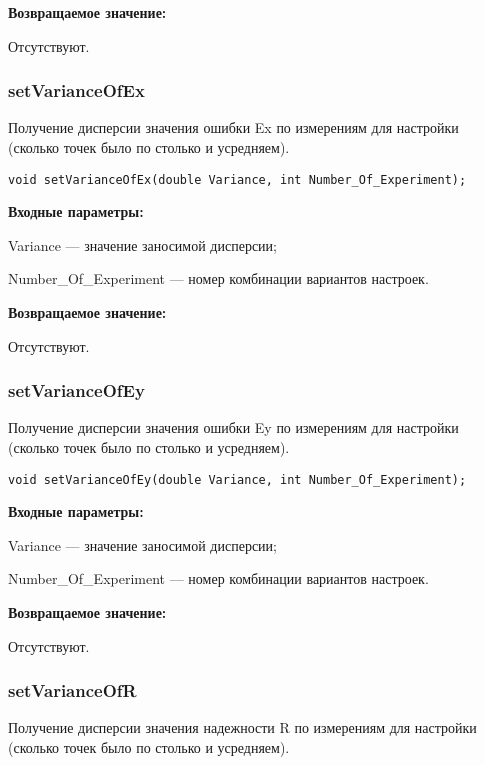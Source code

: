 \documentclass[a4paper,12pt]{article}
\begin{document}
\textbf{Возвращаемое значение:}

Отсутствуют.


\subsubsection{setVarianceOfEx}\label{setVarianceOfEx}

Получение дисперсии значения ошибки Ex по измерениям для настройки (сколько точек было по столько и усредняем).


\begin{lstlisting}[label=code_syntax_setVarianceOfEx,caption=Синтаксис]
void setVarianceOfEx(double Variance, int Number_Of_Experiment);
\end{lstlisting}

\textbf{Входные параметры:}

Variance --- значение заносимой дисперсии;

Number\_Of\_Experiment --- номер комбинации вариантов настроек.

\textbf{Возвращаемое значение:}

Отсутствуют.


\subsubsection{setVarianceOfEy}\label{setVarianceOfEy}

Получение дисперсии значения ошибки Ey по измерениям для настройки (сколько точек было по столько и усредняем).


\begin{lstlisting}[label=code_syntax_setVarianceOfEy,caption=Синтаксис]
void setVarianceOfEy(double Variance, int Number_Of_Experiment);
\end{lstlisting}

\textbf{Входные параметры:}

Variance --- значение заносимой дисперсии;

Number\_Of\_Experiment --- номер комбинации вариантов настроек.

\textbf{Возвращаемое значение:}

Отсутствуют.


\subsubsection{setVarianceOfR}\label{setVarianceOfR}

Получение дисперсии значения надежности R по измерениям для настройки (сколько точек было по столько и усредняем).
\end{document}
